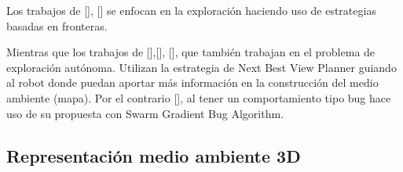 
Los trabajos de \citeauthor{CIESLEWSKI2017}[], \citeauthor{BARTOLOMEI2023}[] se enfocan en la exploración haciendo uso de estrategias basadas en fronteras.

Mientras que los trabajos de \citeauthor{PAPACHRISTOS2017}[],\citeauthor{SELIN2019}[], \citeauthor{RACER2022}[], que también trabajan en el problema de exploración autónoma. Utilizan la estrategia de Next Best View Planner guiando al robot donde puedan aportar más información en la construcción del medio ambiente (mapa). Por el contrario \citeauthor{BUG2019}[], al tener un comportamiento tipo bug hace uso de su propuesta con Swarm Gradient Bug Algorithm.

\subsection{Representación medio ambiente 3D}


